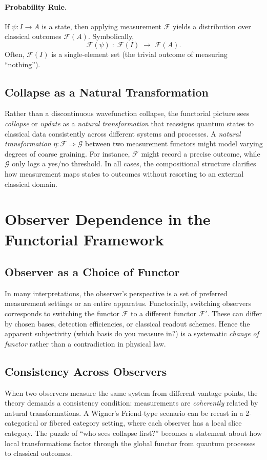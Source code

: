 \documentclass[12pt]{article}
\begin{document}
\paragraph{Probability Rule.}
If \(\psi : I \to A\) is a state, then applying measurement \(\mathcal{F}\) yields a distribution over classical outcomes 
\(\mathcal{F}(A)\). Symbolically,
\[
\mathcal{F}(\psi) \;:\; \mathcal{F}(I) \;\to\; \mathcal{F}(A).
\]
Often, \(\mathcal{F}(I)\) is a single-element set (the trivial outcome of measuring ``nothing'').

\subsection{Collapse as a Natural Transformation}
Rather than a discontinuous wavefunction collapse, the functorial picture sees \emph{collapse} or \emph{update} as a 
\emph{natural transformation} that reassigns quantum states to classical data consistently across different systems and processes. 
A \emph{natural transformation} \(\eta : \mathcal{F} \Rightarrow \mathcal{G}\) between two measurement functors might 
model varying degrees of coarse graining. For instance, \(\mathcal{F}\) might record a precise outcome, while \(\mathcal{G}\) 
only logs a yes/no threshold. In all cases, the compositional structure clarifies how measurement maps states to outcomes 
without resorting to an external classical domain.

\section{Observer Dependence in the Functorial Framework}
\label{sec:observer}

\subsection{Observer as a Choice of Functor}
In many interpretations, the observer's perspective is a set of preferred measurement settings or an entire apparatus. 
Functorially, switching observers corresponds to switching the functor \(\mathcal{F}\) to a different functor \(\mathcal{F}'\). 
These can differ by chosen bases, detection efficiencies, or classical readout schemes. 
Hence the apparent subjectivity (which basis do you measure in?) is a systematic \emph{change of functor} 
rather than a contradiction in physical law.

\subsection{Consistency Across Observers}
When two observers measure the same system from different vantage points, 
the theory demands a consistency condition: measurements are \emph{coherently} related by natural transformations. 
A Wigner's Friend-type scenario can be recast in a 2-categorical or fibered category setting, 
where each observer has a local slice category. The puzzle of “who sees collapse first?” 
becomes a statement about how local transformations factor through the global functor from 
quantum processes to classical outcomes.
\end{document}
